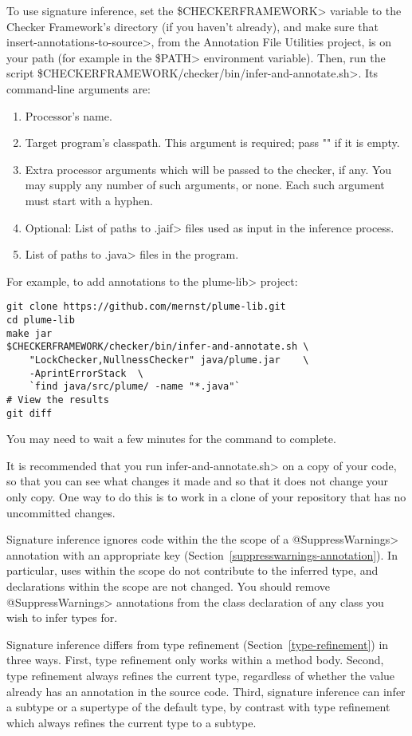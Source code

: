 To use signature inference,
set the \<\$CHECKERFRAMEWORK> variable to the Checker Framework's
directory (if you haven't already), and make sure that
\<insert-annotations-to-source>, from the Annotation File Utilities project,
is on your path (for example in the \<\$PATH> environment variable).
Then, run the script \<\$CHECKERFRAMEWORK/checker/bin/infer-and-annotate.sh>.
Its command-line arguments are:

\begin{enumerate}
\item Processor's name.
\item Target program's classpath.  This argument is required; pass "" if it
  is empty.
\item Extra processor arguments which will be passed to the checker, if any.
  You may supply any number of such arguments, or none.  Each such argument
  must start with a hyphen.
\item Optional: List of paths to \<.jaif> files used as input in the inference
    process.
\item List of paths to \<.java> files in the program.
\end{enumerate}

For example, to add annotations to the \<plume-lib> project:
\begin{Verbatim}
git clone https://github.com/mernst/plume-lib.git
cd plume-lib
make jar
$CHECKERFRAMEWORK/checker/bin/infer-and-annotate.sh \
    "LockChecker,NullnessChecker" java/plume.jar    \
    -AprintErrorStack  \
    `find java/src/plume/ -name "*.java"`
# View the results
git diff    
\end{Verbatim}

You may need to wait a few minutes for the command to complete.

It is recommended that you run \<infer-and-annotate.sh> on a copy of your
code, so that you can see what changes it made and so that it does not
change your only copy.  One way to do this is to work in a clone of your
repository that has no uncommitted changes.

Signature inference ignores code within the the scope of a
\<@SuppressWarnings> annotation with an appropriate key
(Section~\ref{suppresswarnings-annotation}).  In particular, uses within
the scope do not contribute to the inferred type, and declarations within
the scope are not changed.  You should remove \<@SuppressWarnings> annotations
from the class declaration of any class you wish to infer types for.

Signature inference differs from type refinement (Section~\ref{type-refinement})
in three ways.  First, type refinement only works within a method body.
Second, type refinement always
refines the current type, regardless of whether the value already has an
annotation in the source code.
Third, signature inference can infer a subtype
or a supertype of the default type, by contrast with type refinement which
always refines the current type to a subtype.

